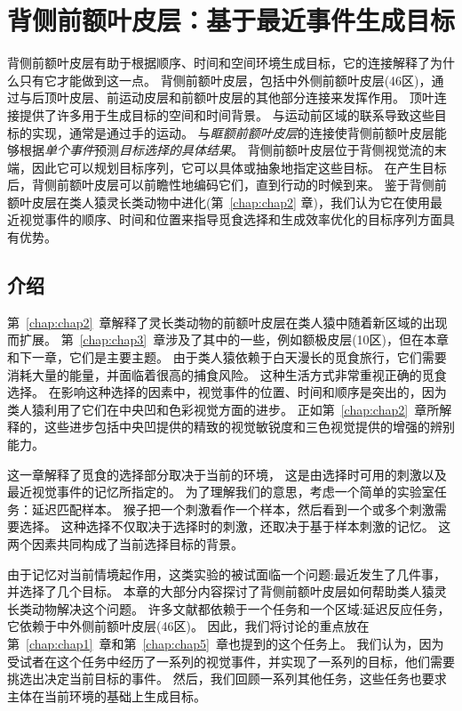 \chapter{背侧前额叶皮层：基于最近事件生成目标} \label{chap:chap6}

背侧前额叶皮层有助于根据顺序、时间和空间环境生成目标，它的连接解释了为什么只有它才能做到这一点。
背侧前额叶皮层，包括中外侧前额叶皮层(46区)，通过与后顶叶皮层、前运动皮层和前额叶皮层的其他部分连接来发挥作用。
顶叶连接提供了许多用于生成目标的空间和时间背景。
与运动前区域的联系导致这些目标的实现，通常是通过手的运动。
与\textit{眶额前额叶皮层}的连接使背侧前额叶皮层能够根据\textit{单个事件}预测\textit{目标选择的具体结果}。
背侧前额叶皮层位于背侧视觉流的末端，因此它可以规划目标序列，它可以具体或抽象地指定这些目标。
在产生目标后，背侧前额叶皮层可以前瞻性地编码它们，直到行动的时候到来。
鉴于背侧前额叶皮层在类人猿灵长类动物中进化(第~\ref{chap:chap2} 章)，我们认为它在使用最近视觉事件的顺序、时间和位置来指导觅食选择和生成效率优化的目标序列方面具有优势。



\section{介绍}

第~\ref{chap:chap2}~章解释了灵长类动物的前额叶皮层在类人猿中随着新区域的出现而扩展。
第~\ref{chap:chap3}~章涉及了其中的一些，例如额极皮层(10区)，但在本章和下一章，它们是主要主题。
由于类人猿依赖于白天漫长的觅食旅行，它们需要消耗大量的能量，并面临着很高的捕食风险。
这种生活方式非常重视正确的觅食选择。
在影响这种选择的因素中，视觉事件的位置、时间和顺序是突出的，因为类人猿利用了它们在中央凹和色彩视觉方面的进步。
正如第~\ref{chap:chap2}~章所解释的，这些进步包括中央凹提供的精致的视觉敏锐度和三色视觉提供的增强的辨别能力。


这一章解释了觅食的选择部分取决于当前的环境，
这是由选择时可用的刺激以及最近视觉事件的记忆所指定的。
为了理解我们的意思，考虑一个简单的实验室任务：延迟匹配样本。
猴子把一个刺激看作一个样本，然后看到一个或多个刺激需要选择。
这种选择不仅取决于选择时的刺激，还取决于基于样本刺激的记忆。
这两个因素共同构成了当前选择目标的背景。


由于记忆对当前情境起作用，这类实验的被试面临一个问题:最近发生了几件事，并选择了几个目标。
本章的大部分内容探讨了背侧前额叶皮层如何帮助类人猿灵长类动物解决这个问题。
许多文献都依赖于一个任务和一个区域:延迟反应任务，它依赖于中外侧前额叶皮层(46区)。
因此，我们将讨论的重点放在第~\ref{chap:chap1}~章和第~\ref{chap:chap5}~章也提到的这个任务上。
我们认为，因为受试者在这个任务中经历了一系列的视觉事件，并实现了一系列的目标，他们需要挑选出决定当前目标的事件。
然后，我们回顾一系列其他任务，这些任务也要求主体在当前环境的基础上生成目标。



